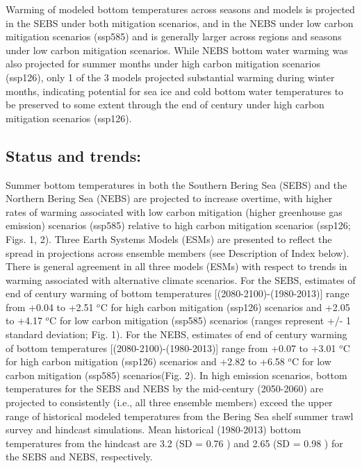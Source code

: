 \documentclass[
]{article}
\begin{document}
Warming of modeled bottom temperatures across seasons and models is
projected in the SEBS under both mitigation scenarios, and in the NEBS
under low carbon mitigation scenarios (ssp585) and is generally larger
across regions and seasons under low carbon mitigation scenarios. While
NEBS bottom water warming was also projected for summer months under
high carbon mitigation scenarios (ssp126), only 1 of the 3 models
projected substantial warming during winter months, indicating potential
for sea ice and cold bottom water temperatures to be preserved to some
extent through the end of century under high carbon mitigation scenarios
(ssp126).

\hypertarget{status-and-trends}{%
\subsection{Status and trends:}\label{status-and-trends}}

Summer bottom temperatures in both the Southern Bering Sea (SEBS) and
the Northern Bering Sea (NEBS) are projected to increase overtime, with
higher rates of warming associated with low carbon mitigation (higher
greenhouse gas emission) scenarios (ssp585) relative to high carbon
mitigation scenarios (ssp126; Figs. 1, 2). Three Earth Systems Models
(ESMs) are presented to reflect the spread in projections across
ensemble members (see Description of Index below). There is general
agreement in all three models (ESMs) with respect to trends in warming
associated with alternative climate scenarios. For the SEBS, estimates
of end of century warming of bottom temperatures
{[}(2080-2100)-(1980-2013){]} range from +0.04 to +2.51 \(^o\)C for high
carbon mitigation (ssp126) scenarios and +2.05 to +4.17 \(^o\)C for low
carbon mitigation (ssp585) scenarios (ranges represent +/- 1 standard
deviation; Fig. 1). For the NEBS, estimates of end of century warming of
bottom temperatures {[}(2080-2100)-(1980-2013){]} range from +0.07 to
+3.01 \(^o\)C for high carbon mitigation (ssp126) scenarios and +2.82 to
+6.58 \(^o\)C for low carbon mitigation (ssp585) scenarios(Fig. 2). In
high emission scenarios, bottom temperatures for the SEBS and NEBS by
the mid-century (2050-2060) are projected to consistently (i.e., all
three ensemble members) exceed the upper range of historical modeled
temperatures from the Bering Sea shelf summer trawl survey and hindcast
simulations. Mean historical (1980-2013) bottom temperatures from the
hindcast are 3.2 (SD = 0.76 ) and 2.65 (SD = 0.98 ) for the SEBS and
NEBS, respectively.
\end{document}
